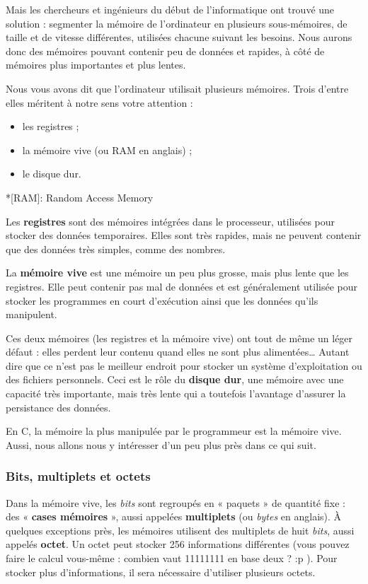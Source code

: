 Mais les chercheurs et ingénieurs du début de l'informatique ont
trouvé une solution : segmenter la mémoire de l'ordinateur en
plusieurs sous-mémoires, de taille et de vitesse différentes,
utilisées chacune suivant les besoins. Nous aurons donc des mémoires
pouvant contenir peu de données et rapides, à côté de mémoires plus
importantes et plus lentes.

Nous vous avons dit que l'ordinateur utilisait plusieurs
mémoires. Trois d'entre elles méritent à notre sens votre attention :

\begin{itemize}
\item
  les registres ;
\item
  la mémoire vive (ou RAM en anglais) ;
\item
  le disque dur.
\end{itemize}

*{[}RAM{]}: Random Access Memory

Les \textbf{registres} sont des mémoires intégrées dans le processeur,
utilisées pour stocker des données temporaires. Elles sont très
rapides, mais ne peuvent contenir que des données très simples, comme
des nombres.

La \textbf{mémoire vive} est une mémoire un peu plus grosse, mais plus
lente que les registres. Elle peut contenir pas mal de données et est
généralement utilisée pour stocker les programmes en court d'exécution
ainsi que les données qu'ils manipulent.

Ces deux mémoires (les registres et la mémoire vive) ont tout de même
un léger défaut : elles perdent leur contenu quand elles ne sont plus
alimentées\ldots{} Autant dire que ce n'est pas le meilleur endroit
pour stocker un système d'exploitation ou des fichiers
personnels. Ceci est le rôle du \textbf{disque dur}, une mémoire avec
une capacité très importante, mais très lente qui a toutefois
l'avantage d'assurer la persistance des données.

En C, la mémoire la plus manipulée par le programmeur est la mémoire
vive. Aussi, nous allons nous y intéresser d'un peu plus près dans ce
qui suit.

\subsubsection{Bits, multiplets et octets}\label{bits-multiplets-et-octets}

Dans la mémoire vive, les \emph{bits} sont regroupés en « paquets » de
quantité fixe : des « \textbf{cases mémoires} », aussi appelées
\textbf{multiplets} (ou \emph{bytes} en anglais). À quelques exceptions
près, les mémoires utilisent des multiplets de huit \emph{bits}, aussi
appelés \textbf{octet}. Un octet peut stocker 256 informations
différentes (vous pouvez faire le calcul vous-même : combien vaut
11111111 en base deux ? :p ). Pour stocker plus d'informations, il sera
nécessaire d'utiliser plusieurs octets.


